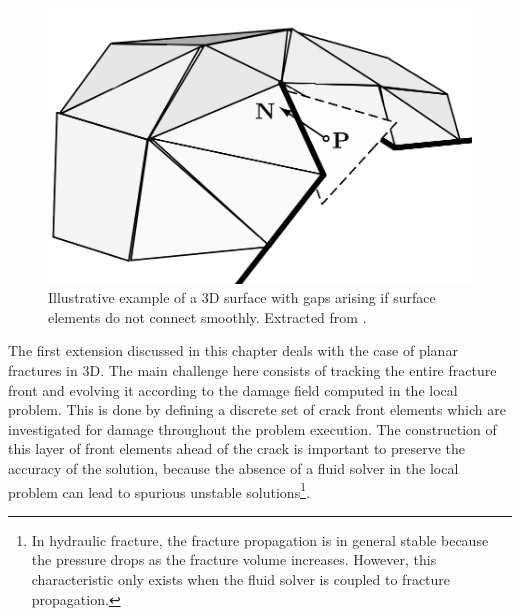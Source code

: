 \begin{figure}[h]
    \centering
    \includegraphics[width=0.6\linewidth]{Chapter4/figures/surface_with_gap.png}
    \caption{Illustrative example of a 3D surface with gaps arising if surface elements do not connect smoothly. Extracted from \cite{gasser20063d}.}
    \label{fig:gaps}
\end{figure}

The first extension discussed in this chapter deals with the case of planar fractures in 3D. The main challenge here consists of tracking the entire fracture front and evolving it according to the damage field computed in the local problem. This is done by defining a discrete set of crack front elements which are investigated for damage throughout the problem execution. The construction of this layer of front elements ahead of the crack is important to preserve the accuracy of the solution, because the absence of a fluid solver in the local problem can lead to spurious unstable solutions\footnote{In hydraulic fracture, the fracture propagation is in general stable because the pressure drops as the fracture volume increases. However, this characteristic only exists when the fluid solver is coupled to fracture propagation.}.  
